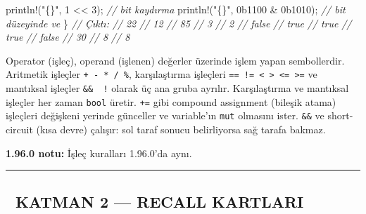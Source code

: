 \documentclass[12pt,a4paper]{article}
\newenvironment{Shaded}{}{}
\newcommand{\BaseNTok}[1]{\textcolor[rgb]{0.25,0.63,0.44}{#1}}
\newcommand{\CommentTok}[1]{\textcolor[rgb]{0.38,0.63,0.69}{\textit{#1}}}
\newcommand{\DecValTok}[1]{\textcolor[rgb]{0.25,0.63,0.44}{#1}}
\newcommand{\NormalTok}[1]{#1}
\newcommand{\OperatorTok}[1]{\textcolor[rgb]{0.40,0.40,0.40}{#1}}
\newcommand{\StringTok}[1]{\textcolor[rgb]{0.25,0.44,0.63}{#1}}
\begin{document}
\begin{Shaded}
\begin{Highlighting}[]
\NormalTok{    println}\OperatorTok{!(}\StringTok{"\{\}"}\OperatorTok{,} \DecValTok{1} \OperatorTok{\textless{}\textless{}} \DecValTok{3}\OperatorTok{);}           \CommentTok{// bit kaydırma}
\NormalTok{    println}\OperatorTok{!(}\StringTok{"\{\}"}\OperatorTok{,} \BaseNTok{0b1100} \OperatorTok{\&} \BaseNTok{0b1010}\OperatorTok{);}  \CommentTok{// bit düzeyinde ve}
\OperatorTok{\}}
\CommentTok{// Çıktı:}
\CommentTok{// 22}
\CommentTok{// 12}
\CommentTok{// 85}
\CommentTok{// 3}
\CommentTok{// 2}
\CommentTok{// false}
\CommentTok{// true}
\CommentTok{// true}
\CommentTok{// true}
\CommentTok{// false}
\CommentTok{// 30}
\CommentTok{// 8}
\CommentTok{// 8}
\end{Highlighting}
\end{Shaded}

Operator (işleç), operand (işlenen) değerler üzerinde işlem yapan sembollerdir. Aritmetik işleçler \texttt{+\ -\ *\ /\ \%}, karşılaştırma işleçleri \texttt{==\ !=\ \textless{}\ \textgreater{}\ \textless{}=\ \textgreater{}=} ve mantıksal işleçler \texttt{\&\&\ \textbar{}\textbar{}\ !} olarak üç ana gruba ayrılır. Karşılaştırma ve mantıksal işleçler her zaman \texttt{bool} üretir. \texttt{+=} gibi compound assignment (bileşik atama) işleçleri değişkeni yerinde günceller ve variable'ın \texttt{mut} olmasını ister. \texttt{\&\&} ve \texttt{\textbar{}\textbar{}} short-circuit (kısa devre) çalışır: sol taraf sonucu belirliyorsa sağ tarafa bakmaz.

\textbf{1.96.0 notu:} İşleç kuralları 1.96.0'da aynı.

\begin{center}\rule{0.5\linewidth}{0.5pt}\end{center}

\subsection{🔵 KATMAN 2 --- RECALL KARTLARI}\label{katman-2-—-recall-kartlari-4}
\end{document}
